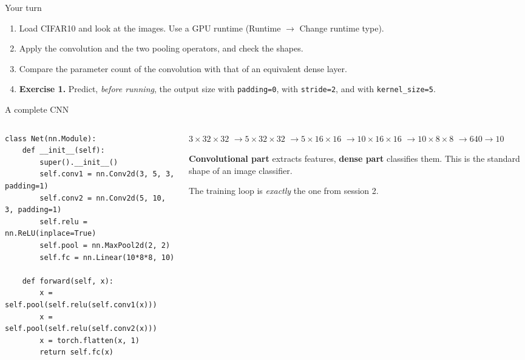 \documentclass[aspectratio=169,10pt]{beamer}
\begin{document}
\begin{frame}{Your turn}
\begin{practice}
\begin{enumerate}
  \item Load CIFAR10 and look at the images. \alert{Use a GPU runtime}
        (Runtime $\rightarrow$ Change runtime type).
  \item Apply the convolution and the two pooling operators, and check the shapes.
  \item Compare the parameter count of the convolution with that of an equivalent dense
        layer.
  \item \textbf{Exercise 1.} Predict, \emph{before running}, the output size with
        \texttt{padding=0}, with \texttt{stride=2}, and with \texttt{kernel\_size=5}.
\end{enumerate}
\end{practice}
\end{frame}

\begin{frame}[fragile]{A complete CNN}
\begin{columns}[T]
\begin{column}{.56\textwidth}
\begin{lstlisting}
class Net(nn.Module):
    def __init__(self):
        super().__init__()
        self.conv1 = nn.Conv2d(3, 5, 3, padding=1)
        self.conv2 = nn.Conv2d(5, 10, 3, padding=1)
        self.relu = nn.ReLU(inplace=True)
        self.pool = nn.MaxPool2d(2, 2)
        self.fc = nn.Linear(10*8*8, 10)

    def forward(self, x):
        x = self.pool(self.relu(self.conv1(x)))
        x = self.pool(self.relu(self.conv2(x)))
        x = torch.flatten(x, 1)
        return self.fc(x)
\end{lstlisting}
\end{column}
\begin{column}{.42\textwidth}
\small
$3\times32\times32$
$\rightarrow 5\times32\times32$
$\rightarrow 5\times16\times16$
$\rightarrow 10\times16\times16$
$\rightarrow 10\times8\times8$
$\rightarrow 640 \rightarrow 10$

\medskip
\textbf{Convolutional part} extracts features, \textbf{dense part} classifies them. This is
the standard shape of an image classifier.

\medskip
The training loop is \emph{exactly} the one from session 2.
\end{column}
\end{columns}
\end{frame}
\end{document}
